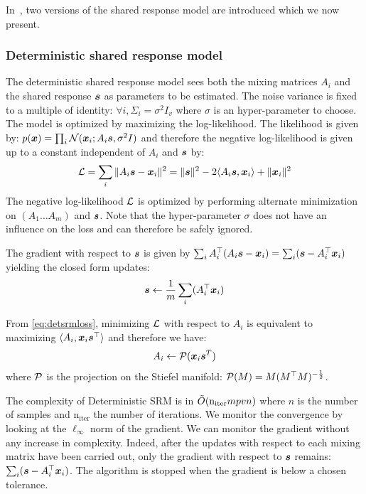In~\cite{chen2015reduced, anderson2016enabling}, two versions of the shared response model are
introduced which we now present.
\subsubsection{Deterministic shared response model}
\label{sec:deterministicsrm}
The deterministic shared response model sees both the mixing matrices $A_i$ and
the shared response $\boldsymbol{s}$ as parameters to be
estimated. The noise variance is fixed to a multiple of identity: $\forall i,
\Sigma_i=\sigma^2 I_v$ where $\sigma$ is an hyper-parameter to choose.
The model is optimized by maximizing the log-likelihood.
The likelihood is given by: $p(\boldsymbol{x}) = \prod_i \mathcal{N}(\boldsymbol{x}_i; A_i \boldsymbol{s}, \sigma^2 I)$ and
therefore the negative log-likelihood is given up to a constant independent of
$A_i$ and $\boldsymbol{s}$ by:
\begin{align}
  \mathcal{L} = \sum_i \|A_i \boldsymbol{s} - \boldsymbol{x}_i \|^2 = \| \boldsymbol{s} \|^2 -2 \langle{ A_i \boldsymbol{s}},{ \boldsymbol{x}_i }\rangle + \| \boldsymbol{x}_i \|^2
  \label{eq:detsrmloss}
\end{align}
The negative log-likelihood $\mathcal{L}$ is optimized by performing alternate minimization on $(A_1 \dots A_m)$
and $\boldsymbol{s}$. Note that the hyper-parameter $\sigma$ does not have an influence on
the loss and can therefore be safely ignored.

The gradient with respect to $\boldsymbol{s}$ is given by $ \sum_i A_i^{\top}(A_i \boldsymbol{s} -
\boldsymbol{x}_i) = \sum_i (\boldsymbol{s} -
A_i^{\top} \boldsymbol{x}_i)$
yielding the closed form updates:
\begin{equation}
  \boldsymbol{s} \leftarrow  \frac1m \sum_i (A_i^{\top} \boldsymbol{x}_i)
  \label{eq:srm:supdate}
\end{equation}

From \eqref{eq:detsrmloss}, minimizing $\mathcal{L}$ with respect to $A_i$ is
equivalent to maximizing $\langle{ A_i},{ \boldsymbol{x}_i \boldsymbol{s}^{\top} }\rangle$ and therefore we
have:
\begin{equation}
  A_i \leftarrow  \mathcal{P}(\boldsymbol{x}_i \boldsymbol{s}^T)
  \label{eq:detsrm:Aiupdate}
\end{equation}
where $\mathcal{P}$ is the projection on the Stiefel manifold: $\mathcal{P}(M) = M
(M^{\top}M)^{-\frac12}$.

The complexity of Deterministic SRM is in $\tilde{O}(\mathrm{n_{iter}} mpvn)$ where
$n$ is the number of samples and $\mathrm{n_{iter}}$ the number of iterations.
We monitor the convergence by looking at the $\ell_{\infty}$ norm of the
gradient. We can monitor the gradient without any increase in complexity.
Indeed, after the updates with respect to each mixing matrix have been
carried out, only the gradient with respect to $\boldsymbol{s}$ remains: $\sum_i
(\boldsymbol{s} - A_i^{\top}\boldsymbol{x}_i)$. The algorithm is stopped when the
gradient is below a chosen tolerance.

